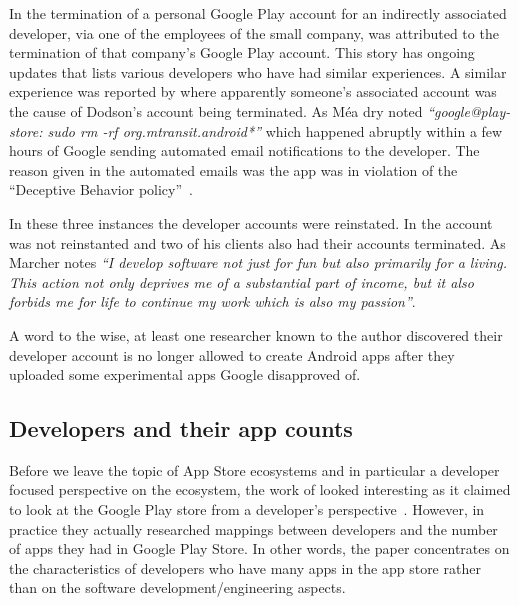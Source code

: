 In \textcite{martinez2019_google_just_terminated_our_startup_google_play_publisher_account_on_xmas_day} the termination of a personal Google Play account for an indirectly associated developer, via one of the employees of the small company, was attributed to the termination of that company's Google Play account. This story has ongoing updates that lists various developers who have had similar experiences. A similar experience was reported by \textcite{dodson2019_google_completely_terminated_our_new_business_etc} where apparently someone's associated account was the cause of Dodson's account being terminated. As Méa dry noted \emph{``google@play-store: sudo rm -rf org.mtransit.android*''} which happened abruptly within a few hours of Google sending automated email notifications to the developer. The reason given in the automated emails was the app was in violation of the ``Deceptive Behavior policy''~. 

In these three instances the developer accounts were reinstated. In \textcite{marcher2021_how_google_terminated-a-developer} the account was not reinstanted and two of his clients also had their accounts terminated. As Marcher notes \emph{``I develop software not just for fun but also primarily for a living. This action not only deprives me of a substantial part of income, but it also forbids me for life to continue my work which is also my passion''}. %

A word to the wise, at least one researcher known to the author discovered their developer account is no longer allowed to create Android apps after they uploaded some experimental apps Google disapproved of.

\subsection{Developers and their app counts}
Before we leave the topic of App Store ecosystems and in particular a developer focused perspective on the ecosystem, the work of \citeauthor{wang2017_exploratory_study_of_the_mobile_app_ecosystem} looked interesting as it claimed to look at the Google Play store from a developer's perspective~. However, in practice they actually researched mappings between developers and the number of apps they had in Google Play Store. In other words, the paper concentrates on the characteristics of developers who have many apps in the app store rather than on the software development/engineering aspects.

